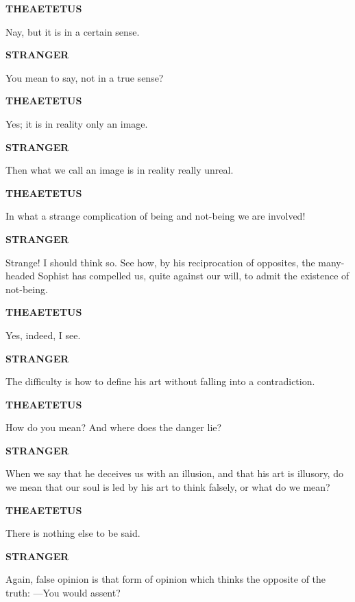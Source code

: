 \documentclass[11pt,letter]{article}
\begin{document}
\par \textbf{THEAETETUS}
\par   Nay, but it is in a certain sense.

\par \textbf{STRANGER}
\par   You mean to say, not in a true sense?

\par \textbf{THEAETETUS}
\par   Yes; it is in reality only an image.

\par \textbf{STRANGER}
\par   Then what we call an image is in reality really unreal.

\par \textbf{THEAETETUS}
\par   In what a strange complication of being and not-being we are involved!

\par \textbf{STRANGER}
\par   Strange! I should think so. See how, by his reciprocation of opposites, the many-headed Sophist has compelled us, quite against our will, to admit the existence of not-being.

\par \textbf{THEAETETUS}
\par   Yes, indeed, I see.

\par \textbf{STRANGER}
\par   The difficulty is how to define his art without falling into a contradiction.

\par \textbf{THEAETETUS}
\par   How do you mean? And where does the danger lie?

\par \textbf{STRANGER}
\par   When we say that he deceives us with an illusion, and that his art is illusory, do we mean that our soul is led by his art to think falsely, or what do we mean?

\par \textbf{THEAETETUS}
\par   There is nothing else to be said.

\par \textbf{STRANGER}
\par   Again, false opinion is that form of opinion which thinks the opposite of the truth: —You would assent?
\end{document}

